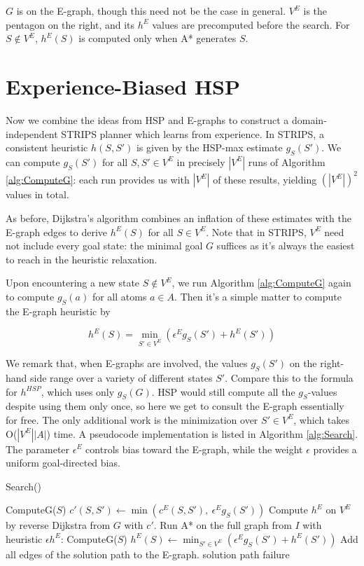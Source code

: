 \documentclass[letterpaper]{article}
\begin{document}
$G$ is on the E-graph, though this need not be the case in general. $V^E$ is the pentagon on the right, and its $h^E$ values are precomputed before the search. For $S\notin V^E$, $h^E(S)$ is computed only when A* generates $S$.

\section{Experience-Biased HSP}

Now we combine the ideas from HSP and E-graphs to construct a domain-independent STRIPS planner which learns from experience. In STRIPS, a consistent heuristic $h(S,S')$ is given by the HSP-max estimate $g_S(S')$. We can compute $g_S(S')$ for all $S,S'\in V^E$ in precisely $|V^E|$ runs of Algorithm \ref{alg:ComputeG}: each run provides us with $|V^E|$ of these results, yielding $(|V^E|)^2$ values in total.

As before, Dijkstra's algorithm combines an inflation of these estimates with the E-graph edges to derive $h^E(S)$ for all $S\in V^E$. Note that in STRIPS, $V^E$ need not include every goal state: the minimal goal $G$ suffices as it's always the easiest to reach in the heuristic relaxation.

Upon encountering a new state $S\notin V^E$, we run Algorithm \ref{alg:ComputeG} again to compute $g_S(a)$ for all atoms $a\in A$. Then it's a simple matter to compute the E-graph heuristic by

\[h^E(S) = \min_{S'\in V^E} \left( \epsilon^E g_S(S') + h^E(S') \right)\]

We remark that, when E-graphs are involved, the values $g_S(S')$ on the right-hand side range over a variety of different states $S'$. Compare this to the formula for $h^{HSP}$, which uses only $g_S(G)$. HSP would still compute all the $g_S$-values despite using them only once, so here we get to consult the E-graph essentially for free. The only additional work is the minimization over $S'\in V^E$, which takes O($|V^E||A|$) time. A pseudocode implementation is listed in Algorithm \ref{alg:Search}. The parameter $\epsilon^E$ controls bias toward the E-graph, while the weight $\epsilon$ provides a uniform goal-directed bias.

\begin{algorithm}
\caption{Search()}
\label{alg:Search}
\begin{algorithmic}
\STATE ComputeG($S$)
\STATE $c'(S,S') \leftarrow \min\left(c^E(S,S'),~\epsilon^E g_S(S')\right)$
\ENDFOR
\ENDFOR
\STATE Compute $h^E$ on $V^E$ by reverse Dijkstra from $G$ with $c'$.
\STATE Run A* on the full graph from $I$ with heuristic $\epsilon h^E$:
\STATE ComputeG($S$)
\STATE $h^E(S) \leftarrow \min_{S'\in V^E} \left( \epsilon^E g_S(S') + h^E(S') \right)$
\ENDFOR
{}
\STATE Add all edges of the solution path to the E-graph.
\RETURN solution path
\ELSE
\RETURN failure
\ENDIF
\end{algorithmic}
\end{algorithm}
\end{document}
